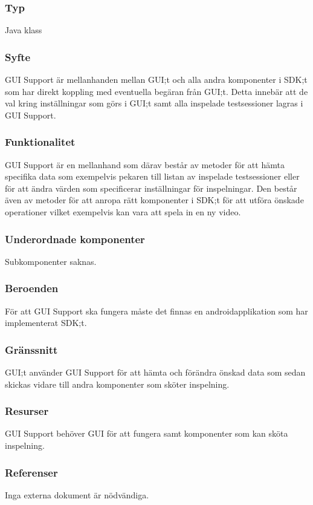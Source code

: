\subsubsection{Typ}
Java klass

\subsubsection{Syfte}
GUI Support är mellanhanden mellan GUI;t och alla andra komponenter i SDK;t som har direkt koppling med eventuella begäran från GUI;t. Detta innebär att de val kring inställningar som görs i GUI;t  samt alla inspelade testsessioner lagras i GUI Support.

\subsubsection{Funktionalitet}
GUI Support är en mellanhand som därav består av metoder för att hämta specifika data som exempelvis pekaren till listan av inspelade testsessioner eller för att ändra värden som specificerar inställningar för inspelningar. Den består även av metoder för att anropa rätt komponenter i SDK;t för att utföra önskade operationer vilket exempelvis kan vara att spela in en ny video.

\subsubsection{Underordnade komponenter}
Subkomponenter saknas.

\subsubsection{Beroenden}
För att GUI Support ska fungera måste det finnas en androidapplikation som har implementerat SDK;t.

\subsubsection{Gränssnitt}
GUI;t använder GUI Support för att hämta och förändra önskad data som sedan skickas vidare till andra komponenter som sköter inspelning.

\subsubsection{Resurser}
GUI Support behöver GUI för att fungera samt komponenter som kan sköta inspelning.

\subsubsection{Referenser}
Inga externa dokument är nödvändiga.

